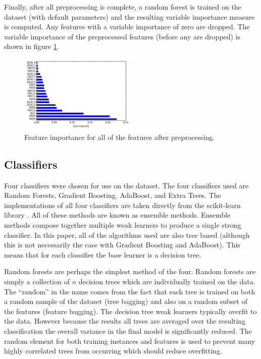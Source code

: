 \documentclass[journal]{IEEEtran}
\begin{document}
Finally, after all preprocessing is complete, a random forest is trained on the dataset (with default parameters) and the resulting variable importance measure is computed. Any features with a variable importance of zero are dropped. The variable importance of the preprocessed features (before any are dropped) is shown in figure \ref{fig:feature-importance}.

\begin{figure}[!t]
\centering
\includegraphics[width=0.5\textwidth]{../src/img/feature_importance.png}
\caption{Feature importance for all of the features after preprocessing.}
\label{fig:feature-importance}
\end{figure}

\subsection{Classifiers}
\label{subsec:classifiers}
Four classifiers were chosen for use on the dataset. The four classifiers used are Random Forests, Gradient Boosting, AdaBoost, and Extra Trees. The implementations of all four classifiers are taken directly from the scikit-learn library \cite{pedregosa2011scikit}. All of these methods are known as ensemble methods. Ensemble methods compose together multiple weak learners to produce a single strong classifier. In this paper, all of the algorithms used are also tree based (although this is not necessarily the case with Gradient Boosting and AdaBoost). This means that for each classifier the base learner is a decision tree.

Random forests \cite{breiman2001random} are perhaps the simplest method of the four. Random forests are simply a collection of $n$ decision trees which are individually trained on the data. The ``random'' in the name comes from the fact that each tree is trained on both a random sample of the dataset (tree bagging) and also on a random subset of the features (feature bagging). The decision tree weak learners typically overfit to the data. However because the results all trees are averaged over the resulting classification the overall variance in the final model is significantly reduced. The random element for both training instances and features is used to prevent many highly correlated trees from occurring which should reduce overfitting. 
\end{document}
